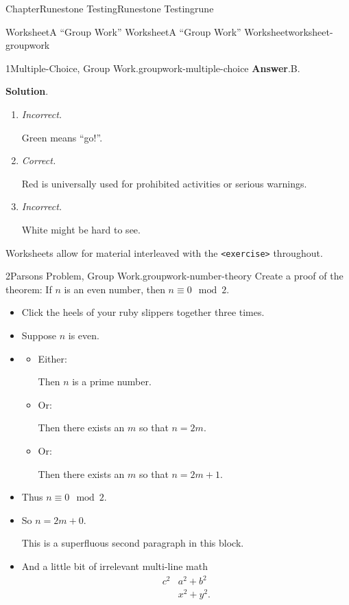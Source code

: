 \documentclass[oneside,10pt,]{book}
\newcommand{\blocktitlefont}{\relax}
\newcommand{\mono}[1]{\texttt{#1}}
\newcommand{\lititle}[1]{{\slshape#1}}
\numberwithin{equation}{section}
\begin{document}
\begin{chapterptx}{Chapter}{Runestone Testing}{}{Runestone Testing}{}{}{rune}
\begin{worksheet-section}{Worksheet}{A ``Group Work'' Worksheet}{}{A ``Group Work'' Worksheet}{}{}{worksheet-groupwork}
\begin{divisionexercise}{1}{Multiple-Choice, Group Work.}{}{groupwork-multiple-choice}
\noindent\textbf{\blocktitlefont Answer}.\hypertarget{groupwork-multiple-choice-7}{}\quad{}B.%
\par\smallskip%
\noindent\textbf{\blocktitlefont Solution}.\hypertarget{groupwork-multiple-choice-8}{}\quad{}%
\begin{enumerate}[label={\Alph*.}]
\item{}\lititle{Incorrect.}\par%
Green means ``go!''.%
\item{}\lititle{Correct.}\par%
Red is universally used for prohibited activities or serious warnings.%
\item{}\lititle{Incorrect.}\par%
White might be hard to see.%
\end{enumerate}
%
\end{divisionexercise}%
Worksheets allow for material interleaved with the \mono{<exercise>} throughout.%
\begin{divisionexercise}{2}{Parsons Problem, Group Work.}{}{groupwork-number-theory}%
%
%
Create a proof of the theorem: If \(n\) is an even number, then \(n\equiv 0\mod 2\).%
\par
%
\begin{itemize}[label=\textbullet]
\item{}Click the heels of your ruby slippers together three times.%
\item{}Suppose \(n\) is even.%
\item{}%
\begin{itemize}[label=]
\item{}Either:%
\par
Then \(n\) is a prime number.%
\item{}Or:%
\par
Then there exists an \(m\) so that \(n = 2m\).%
\item{}Or:%
\par
Then there exists an \(m\) so that \(n = 2m + 1\).%
\end{itemize}
%
\item{}Thus \(n\equiv 0\mod 2\).%
\item{}So \(n = 2m + 0\).%
\par
This is a superfluous second paragraph in this block.%
\item{}And a little bit of irrelevant multi-line math%
\begin{align*}
c^2&a^2+b^2\\
&x^2+y^2\text{.}
\end{align*}

\end{itemize}
\end{divisionexercise}
\end{worksheet-section}
\end{chapterptx}
\end{document}
